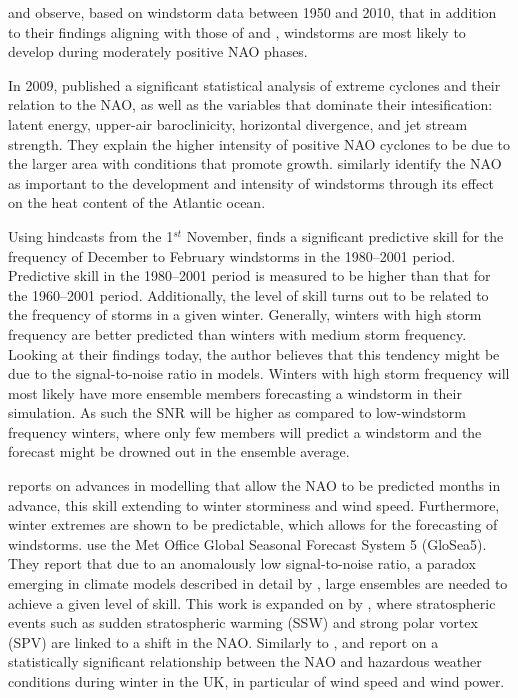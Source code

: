         \cite{https://doi.org/10.1002/joc.1982} and \cite{https://doi.org/10.1002/2014GL059647} observe, based on windstorm data between 1950 and 2010, that in addition to their findings aligning with those of \citeauthor{TheEffectsofNorthAtlanticSSTandSeaIceAnomaliesontheWinterCirculationinCCM3PartIMainFeaturesandStormTrackCharacteristicsoftheResponse} and \citeauthor{Hurrell2003}, windstorms are most likely to develop during moderately positive NAO phases. 
    
        In 2009, \cite{Pinto2009} published a significant statistical analysis of extreme cyclones and their relation to the NAO, as well as the variables that dominate their intesification: latent energy, upper-air baroclinicity, horizontal divergence, and jet stream strength. They explain the higher intensity of positive NAO cyclones to be due to the larger area with conditions that promote growth. \cite{HURRELL200928} similarly identify the NAO as important to the development and intensity of windstorms through its effect on the heat content of the Atlantic ocean.
    
        Using hindcasts from the 1$^{st}$ November, \cite{Renggli2011} finds a significant predictive skill for the frequency of December to February windstorms in the 1980–2001 period. Predictive skill in the 1980–2001 period is measured to be higher than that for the 1960–2001 period. Additionally, the level of skill turns out to be related to the frequency of storms in a given winter. Generally, winters with high storm frequency are better predicted than winters with medium storm frequency. Looking at their findings today, the author believes that this tendency might be due to the signal-to-noise ratio in models. Winters with high storm frequency will most likely have more ensemble members forecasting a windstorm in their simulation. As such the SNR will be higher as compared to low-windstorm frequency winters, where only few members will predict a windstorm and the forecast might be drowned out in the ensemble average.
    
        \cite{Scaifehttps://doi.org/10.1002/2014GL059637} reports on advances in modelling that allow the NAO to be predicted months in advance, this skill extending to winter storminess and wind speed. Furthermore, winter extremes are shown to be predictable, which allows for the forecasting of windstorms. \citeauthor{Scaifehttps://doi.org/10.1002/2014GL059637} use the Met Office Global Seasonal Forecast System 5 (GloSea5). They report that due to an anomalously low signal-to-noise ratio, a paradox emerging in climate models described in detail by \cite{Scaife2018}, large ensembles are needed to achieve a given level of skill. This work is expanded on by \cite{Scaife2016}, where stratospheric events such as sudden stratospheric warming (SSW) and strong polar vortex (SPV) are linked to a shift in the NAO. Similarly to \citeauthor{Scaifehttps://doi.org/10.1002/2014GL059637}, \cite{Palin2016} and \cite{Clark_2017} report on a statistically significant relationship between the NAO and hazardous weather conditions during winter in the UK, in particular of wind speed and wind power. 
    
